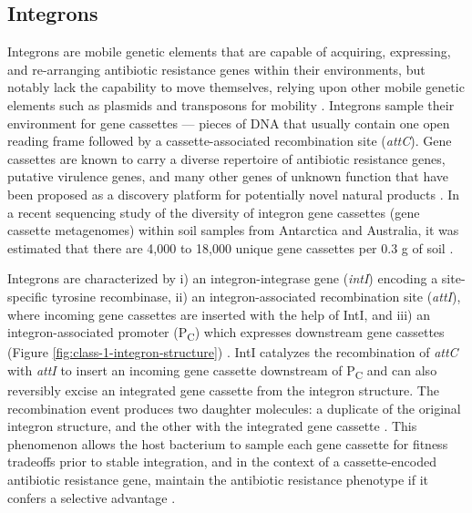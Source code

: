 \subsection{Integrons}

Integrons are mobile genetic elements that are capable of acquiring, expressing, and re-arranging antibiotic resistance genes within their environments, but notably lack the capability to move themselves, relying upon other mobile genetic elements such as plasmids and transposons for mobility \parencite{Gillings.2014}.
Integrons sample their environment for gene cassettes \parencite{Ghaly.2020} --- pieces of DNA that usually contain one open reading frame followed by a cassette-associated recombination site (\textit{attC}).
Gene cassettes are known to carry a diverse repertoire of antibiotic resistance genes, putative virulence genes, and many other genes of unknown function that have been proposed as a discovery platform for potentially novel natural products \parencite{Ma.2017, Ghaly.2019, Ghaly.2020}.
In a recent sequencing study of the diversity of integron gene cassettes (gene cassette metagenomes) within soil samples from Antarctica and Australia, it was estimated that there are 4,000 to 18,000 unique gene cassettes per 0.3 g of soil \parencite{Ghaly.2019}.

Integrons are characterized by i) an integron-integrase gene (\textit{intI}) encoding a site-specific tyrosine recombinase, ii) an integron-associated recombination site (\textit{attI}), where incoming gene cassettes are inserted with the help of IntI, and iii) an integron-associated promoter (P\textsubscript{C}) which expresses downstream gene cassettes (Figure \ref{fig:class-1-integron-structure}) \parencite{Gillings.2014}.
IntI catalyzes the recombination of \textit{attC} with \textit{attI} to insert an incoming gene cassette downstream of P\textsubscript{C} and can also reversibly excise an integrated gene cassette from the integron structure.
The recombination event produces two daughter molecules: a duplicate of the original integron structure, and the other with the integrated gene cassette \parencite{Ghaly.2020}.
This phenomenon allows the host bacterium to sample each gene cassette for fitness tradeoffs prior to stable integration, and in the context of a cassette-encoded antibiotic resistance gene, maintain the antibiotic resistance phenotype if it confers a selective advantage \parencite{Ghaly.2020}.

